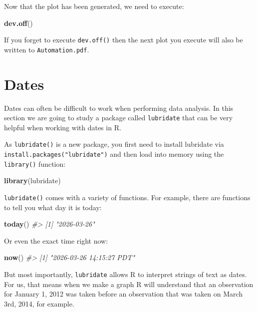 \documentclass[
]{book}
\newenvironment{Shaded}{\begin{snugshade}}{\end{snugshade}}
\newcommand{\CommentTok}[1]{\textcolor[rgb]{0.56,0.35,0.01}{\textit{#1}}}
\newcommand{\FunctionTok}[1]{\textcolor[rgb]{0.13,0.29,0.53}{\textbf{#1}}}
\newcommand{\NormalTok}[1]{#1}
\begin{document}
Now that the plot has been generated, we need to execute:

\begin{Shaded}
\begin{Highlighting}[]
\FunctionTok{dev.off}\NormalTok{()}
\end{Highlighting}
\end{Shaded}

If you forget to execute \texttt{dev.off()} then the next plot you execute will also be written to \texttt{Automation.pdf}.

\section{Dates}\label{dates}

Dates can often be difficult to work when performing data analysis. In this section we are going to study a package called \texttt{lubridate} that can be very helpful when working with dates in R.

As \texttt{lubridate()} is a new package, you first need to install lubridate via \texttt{install.packages("lubridate")} and then load into memory using the \texttt{library()} function:

\begin{Shaded}
\begin{Highlighting}[]
\FunctionTok{library}\NormalTok{(lubridate)}
\end{Highlighting}
\end{Shaded}

\texttt{lubridate()} comes with a variety of functions. For example, there are functions to tell you what day it is today:

\begin{Shaded}
\begin{Highlighting}[]
\FunctionTok{today}\NormalTok{()}
\CommentTok{\#\textgreater{} [1] "2026{-}03{-}26"}
\end{Highlighting}
\end{Shaded}

Or even the exact time right now:

\begin{Shaded}
\begin{Highlighting}[]
\FunctionTok{now}\NormalTok{()}
\CommentTok{\#\textgreater{} [1] "2026{-}03{-}26 14:15:27 PDT"}
\end{Highlighting}
\end{Shaded}

But most importantly, \texttt{lubridate} allows R to interpret strings of text as dates. For us, that means when we make a graph R will understand that an observation for January 1, 2012 was taken before an observation that was taken on March 3rd, 2014, for example.
\end{document}
